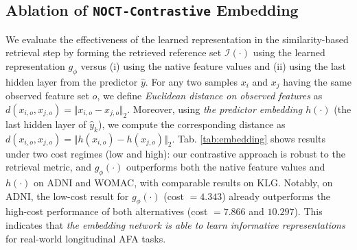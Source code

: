 \subsection{Ablation of \texttt{NOCT-Contrastive} Embedding }
We evaluate the effectiveness of the learned representation in the similarity-based retrieval step by forming the retrieved reference set $\mathcal{I}(\cdot)$ using the learned representation $g_\phi$ versus (i) using the native feature values and (ii) using the last hidden layer from the predictor $\hat{y}$. For any two samples $x_i$ and $x_j$ having the same observed feature set $o$, we define \emph{Euclidean distance on observed features} as $d(x_{i,o}, x_{j,o}) = \Vert x_{i,o} - x_{j,o} \Vert_{2}$. Moreover, using \emph{the predictor embedding $h(\cdot)$} (the last hidden layer of $\hat{y}_k$), we compute the corresponding distance as $d(x_{i,o}, x_{j,o}) = \Vert h(x_{i,o}) - h(x_{j,o})\Vert_{2}$. Tab. \ref{tab:embedding} shows results under two cost regimes (low and high): our contrastive approach is robust to the retrieval metric, and $g_\phi(\cdot)$ outperforms both the native feature values and $h(\cdot)$ on ADNI and WOMAC, with comparable results on KLG. Notably, on ADNI, the low-cost result for $g_\phi(\cdot)$ (cost $= 4.343$) already outperforms the high-cost performance of both alternatives (cost $=7.866$ and $10.297$). This indicates that \emph{the embedding network is able to learn informative representations} for real-world longitudinal AFA tasks. 

